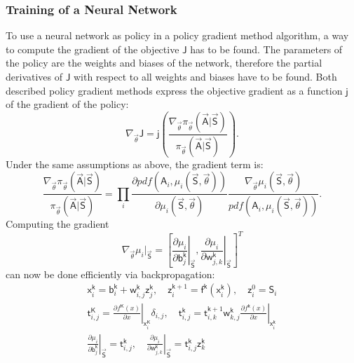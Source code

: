\subsubsection{Training of a Neural Network}
To use a neural network as policy in a policy gradient method algorithm, a way to compute the gradient of the objective $\mathsf{J}$ has to be found. The parameters of the policy are the weights and biases of the network, therefore the partial derivatives of $\mathsf{J}$ with respect to all weights and biases have to be found. Both described policy gradient methods express the objective gradient as a function $\mathsf{j}$ of the gradient of the policy: 
\begin{equation}
	\nabla_{\vec{\theta}} \mathsf{J} = \mathsf{j}\left(\frac{\nabla_{\vec{\theta}}\pi_{\vec{\theta}}(\vec{\mathsf{A}}|\vec{\mathsf{S}})} {\pi_{\vec{\theta}}(\vec{\mathsf{A}}|\vec{\mathsf{S}})}\right). \label{eq:grad_f}
\end{equation} 
Under the same assumptions as above, the gradient term is: \cite[p. 335]{sutton_reinforcement_2018}
\begin{equation}
	\frac{\nabla_{\vec{\theta}}\pi_{\vec{\theta}}(\vec{\mathsf{A}}|\vec{\mathsf{S}})} {\pi_{\vec{\theta}}(\vec{\mathsf{A}}|\vec{\mathsf{S}})} = \prod_i \frac{\partial pdf(\mathsf{A}_i, \mu_i(\vec{\mathsf{S}},\vec{\theta}))}{\partial \mu_i(\vec{\mathsf{S}}, \vec{\theta})} \frac{\nabla_{\vec{\theta}} \mu_i(\vec{\mathsf{S}},\vec{\theta})}{pdf(\mathsf{A}_i, \mu_i(\vec{\mathsf{S}}, \vec{\theta}))}. \label{eq:logit}
\end{equation}
Computing the gradient
\begin{equation}
	\nabla_{\vec{\theta}} \mu_i |_{\vec{\mathsf{S}}} = \left[\left. \frac{\partial \mu_i}{\partial \mathsf{b}^\mathsf{k}_j} \right|_{\vec{\mathsf{S}}}, 
	\left.\frac{\partial \mu_i}{\partial \mathsf{w}^\mathsf{k}_{j,k}}\right|_{\vec{\mathsf{S}}} \right]^T \label{eq:backprop2}
\end{equation}
can now be done efficiently via backpropagation:
\begin{gather}
	\mathsf{x}^\mathsf{k}_i = \mathsf{b}^{\mathsf{k}}_i + \mathsf{w}^{\mathsf{k}}_{i,j}\mathsf{z}^\mathsf{\mathsf{k}}_j, \quad \mathsf{z}^{\mathsf{k}+1}_i = \mathsf{f}^\mathsf{k}(\mathsf{x}^\mathsf{k}_i), \quad \mathsf{z}^0_i = \mathsf{S}_i \\
	\mathsf{t}^\mathsf{K}_{i,j} = \left.\frac{\partial f^\mathsf{K}(x)}{\partial x}\right|_{\mathsf{x}^\mathsf{K}_i} \delta_{i,j}, \quad \left.\mathsf{t}^{\mathsf{k}}_{i,j} = \mathsf{t}^{\mathsf{k}+1}_{i,k} \mathsf{w}^\mathsf{k}_{k,j} \frac{\partial f^\mathsf{k}(x)}{\partial x}\right|_{\mathsf{x}^\mathsf{k}_i} \\
	\left. \frac{\partial \mu_i}{\partial \mathsf{b}^\mathsf{k}_j}\right|_{\vec{\mathsf{S}}} = \mathsf{t}^\mathsf{k}_{i,j}, \quad \left. \frac{\partial \mu_i}{\partial \mathsf{w}^\mathsf{k}_{j,k}} \right|_{\vec{\mathsf{S}}} = \mathsf{t}^\mathsf{k}_{i,j} \mathsf{z}^\mathsf{k}_k
\end{gather}
